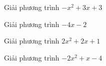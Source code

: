\begin{ex}
Giải phương trình $- x^{2} + 3 x + 3$
\end{ex}
\begin{ex}
Giải phương trình $- 4 x - 2$
\end{ex}
\begin{ex}
Giải phương trình $2 x^{2} + 2 x + 1$
\end{ex}
\begin{ex}
Giải phương trình $- 2 x^{2} + x - 4$
\end{ex}
